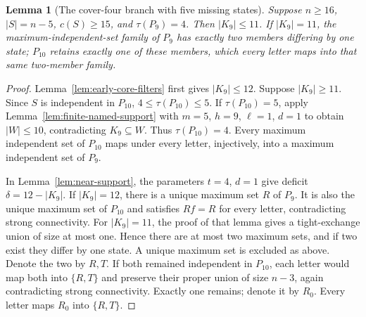 \documentclass[11pt]{article}
\newtheorem{lemma}[theorem]{Lemma}
\theoremstyle{definition}
\theoremstyle{plain}
\begin{document}
\begin{lemma}[The cover-four branch with five missing states]\label{lem:low-cover-core-size}
Suppose $n\ge16$, $|S|=n-5$, $c(S)\ge15$, and $\tau(P_9)=4$.
Then $|K_9|\le11$. If $|K_9|=11$, the maximum-independent-set
family of $P_9$ has exactly two members differing by one state;
$P_{10}$ retains exactly one of these members, which every letter
maps into that same two-member family.
\end{lemma}
\begin{proof}
Lemma~\ref{lem:early-core-filters} first gives $|K_9|\le12$.
Suppose $|K_9|\ge11$. Since $S$ is independent in $P_{10}$,
$4\le\tau(P_{10})\le5$.
If $\tau(P_{10})=5$, apply Lemma~\ref{lem:finite-named-support}
with $m=5$, $h=9$, $\ell=1$, $d=1$ to obtain $|W|\le10$,
contradicting $K_9\subseteq W$. Thus $\tau(P_{10})=4$.
Every maximum independent set of $P_{10}$ maps under every letter,
injectively, into a maximum independent set of $P_9$.

In Lemma~\ref{lem:near-support}, the parameters $t=4$, $d=1$
give deficit $\delta=12-|K_9|$.
If $|K_9|=12$, there is a unique maximum set $R$ of $P_9$.
It is also the unique maximum set of $P_{10}$ and satisfies $Rf=R$
for every letter, contradicting strong connectivity.
For $|K_9|=11$, the proof of that lemma gives a tight-exchange union
of size at most one. Hence there are at most two maximum sets,
and if two exist they differ by one state. A unique maximum set
is excluded as above. Denote the two by $R,T$.
If both remained independent in $P_{10}$, each letter would map
both into $\{R,T\}$ and preserve their proper union of size $n-3$,
again contradicting strong connectivity. Exactly one remains;
denote it by $R_0$. Every letter maps $R_0$ into $\{R,T\}$.
\end{proof}
\end{document}
